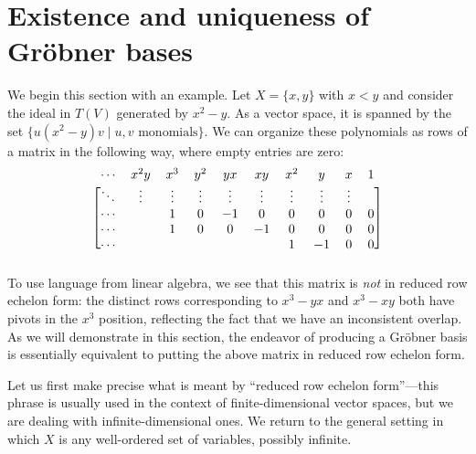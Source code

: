 \section{Existence and uniqueness of Gr\"obner bases}\label{sec:rref}
We begin this section with an example. Let $X = \{x,y\}$ with $x<y$ and consider the ideal in $T(V)$ generated by $x^2 - y$. As a vector space, it is spanned by the set $\{u(x^2 - y)v \mid u,v\text{ monomials}\}$. We can organize these polynomials as rows of a matrix in the following way, where empty entries are zero:
\[
	\begin{blockarray}{cccccccccc}
	\cdots & x^2 y & x^3 & y^2 & yx & xy & x^2 & y & x & 1\\
	\begin{block}{[cccccccccc]}
	\ddots&\vdots& \vdots & \vdots& \vdots& \vdots& \vdots& \vdots& \vdots\\
	\cdots&&1 & 0 & -1 & 0 & 0 & 0 & 0 & 0\\
	\cdots&&1 & 0 & 0 & -1 & 0 & 0 & 0 & 0\\
	\cdots&& &  &  &  & 1 & -1 & 0 & 0\\
	\end{block}
	\end{blockarray}
\]
To use language from linear algebra, we see that this matrix is \emph{not} in reduced row echelon form: the distinct rows corresponding to $x^3 - yx$ and $x^3 - xy$ both have pivots in the $x^3$ position, reflecting the fact that we have an inconsistent overlap. As we will demonstrate in this section, the endeavor of producing a Gr\"obner basis is essentially equivalent to putting the above matrix in reduced row echelon form.

Let us first make precise what is meant by ``reduced row echelon form''---this phrase is usually used in the context of finite-dimensional vector spaces, but we are dealing with infinite-dimensional ones. We return to the general setting in which $X$ is any well-ordered set of variables, possibly infinite.

